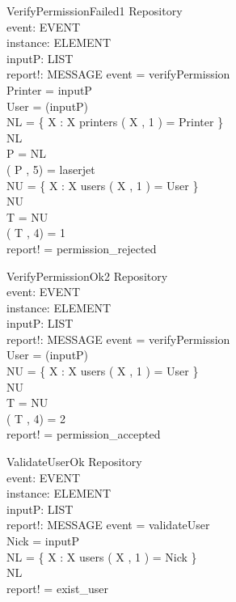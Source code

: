 \begin{schema}{VerifyPermissionFailed1}
\Delta Repository \\
event: EVENT \\
instance: ELEMENT \\
inputP: LIST \\
report!: MESSAGE
\where event = verifyPermission \\
Printer = \head inputP \\
User = \head (\tail inputP) \\
NL = \{ X : \nat \bbar X \mem printers \land \nth( X , 1 ) = Printer \} \\
NL \neq \emptyset \\
P = \head NL \\
\nth( P , 5) = laserjet \\
NU = \{ X : \nat \bbar X \mem users \land \nth( X , 1 ) = User \} \\
NU \neq \emptyset \\
T = \head NU \\
\nth( T , 4) = 1 \\
report! = permission\_rejected
\end{schema}

\begin{schema}{VerifyPermissionOk2}
\Delta Repository \\
event: EVENT \\
instance: ELEMENT \\
inputP: LIST \\
report!: MESSAGE
\where event = verifyPermission \\
User = \head (\tail inputP) \\
NU = \{ X : \nat \bbar X \mem users \land \nth( X , 1 ) = User \} \\
NU \neq \emptyset \\
T = \head NU \\
\nth( T , 4) = 2 \\
report! = permission\_accepted
\end{schema}

\begin{schema}{ValidateUserOk}
\Delta Repository \\
event: EVENT \\
instance: ELEMENT \\
inputP: LIST \\
report!: MESSAGE
\where event = validateUser \\
Nick = \head inputP \\
NL = \{ X : \nat \bbar X \mem users \land \nth( X , 1 ) = Nick \} \\
NL \neq \emptyset \\
report! = exist\_user
\end{schema}


